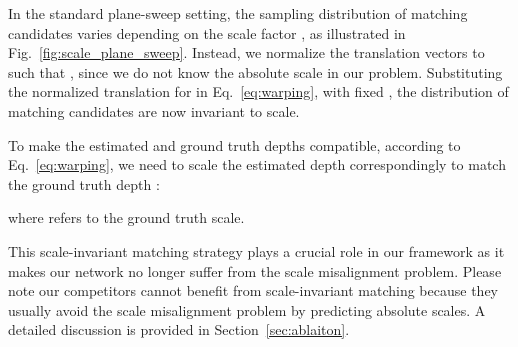 \documentclass[final]{cvpr}
\begin{document}
In the standard plane-sweep setting, the sampling distribution of matching candidates varies depending on the scale factor , as illustrated in Fig.~\ref{fig:scale_plane_sweep}. Instead, we normalize the translation vectors to  such that , since we do not know the absolute scale in our problem. Substituting the normalized translation  for  in Eq.~\eqref{eq:warping}, with fixed , the distribution of matching candidates  are now invariant to scale.

To make the estimated and ground truth depths compatible, according to Eq.~\eqref{eq:warping}, we need to scale the estimated depth  correspondingly to match the ground truth depth : 

where  refers to the ground truth scale.

This scale-invariant matching strategy plays a crucial role in our framework as it makes our network no longer suffer from the scale misalignment problem. Please note our competitors cannot benefit from scale-invariant matching because they usually avoid the scale misalignment problem by predicting absolute scales. A detailed discussion is provided in Section~\ref{sec:ablaiton}.
\end{document}
